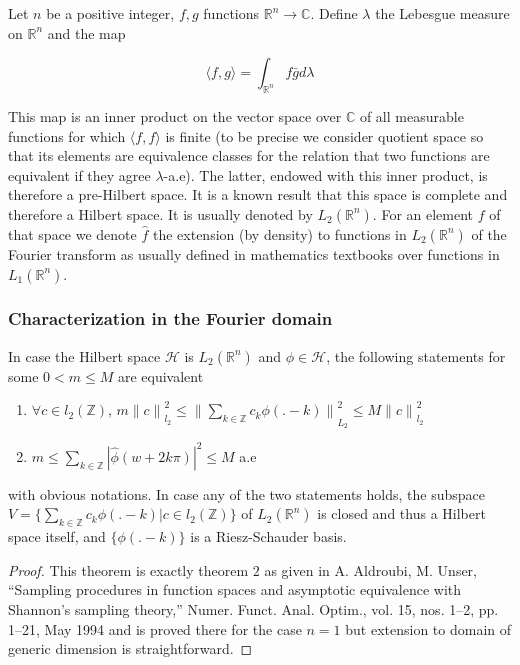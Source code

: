 \documentclass[a4paper, 11pt]{article}
\begin{document}
Let $n$ be a positive integer, $f, g$ functions $\mathbb{R}^n \to \mathbb{C}$. Define $\lambda$ the Lebesgue measure on 
$\mathbb{R}^n$ and the map 

\begin{equation*}
  \langle f,g\rangle = \int_{\mathbb{R}^n} f\bar{g} d\lambda
\end{equation*}

This map is an inner product on the vector space over $\mathbb{C}$ of all measurable functions for which $\langle f,f 
\rangle$ is finite (to be precise we consider quotient space so that its elements are equivalence classes for the 
relation that two functions are equivalent if they agree $\lambda$-a.e).  The latter, endowed with this inner product, 
is therefore a pre-Hilbert space.  It is a known result that this space is complete and therefore a Hilbert space.  It 
is usually denoted by $L_2(\mathbb{R}^n)$.  For an element $f$ of that space we denote $\hat{f}$ the extension (by 
density) to functions in $L_2(\mathbb{R}^n)$ of the Fourier transform as usually defined in mathematics textbooks over 
functions in $L_1(\mathbb{R}^n)$.

\subsubsection{Characterization in the Fourier domain}

\begin{thm}{2}
  In case the Hilbert space $\mathcal{H}$ is $L_2(\mathbb{R}^n)$ and $\phi \in \mathcal{H}$, the following statements 
  for some $0 < m \leq M$ are equivalent
  \begin{enumerate}
    \item $\forall c \in l_2(\mathbb{Z})$, $\displaystyle m {\|c\|}_{l_2}^2 \leq {\| \sum_{k \in \mathbb{Z}} c_k 
      \phi(.-k) \|}_{L_2}^2 \leq M {\|c\|}_{l_2}^2$
    \item $\displaystyle m \leq  \sum_{k \in \mathbb{Z}} {|\hat{\phi}(w+2k\pi)|}^2 \leq M$ a.e
  \end{enumerate}
  with obvious notations. In case any of the two statements holds, the subspace $\displaystyle V= \{ \sum_{k \in 
  \mathbb{Z}} c_k \phi(.-k) | c \in l_2(\mathbb{Z}) \}$ of $L_2(\mathbb{R}^n)$ is closed and thus a Hilbert space 
  itself, and $\{\phi(.-k)\}$ is a Riesz-Schauder basis.
\end{thm}

\begin{proof}This theorem is exactly theorem $2$ as given in A. Aldroubi, M. Unser, “Sampling procedures in function 
  spaces and asymptotic equivalence with Shannon’s sampling theory,” Numer. Funct. Anal. Optim., vol. 15, nos. 1–2, pp.  
  1–21, May 1994 and is proved there for the case $n=1$ but extension to domain of generic dimension is straightforward.
\end{proof}
\end{document}
